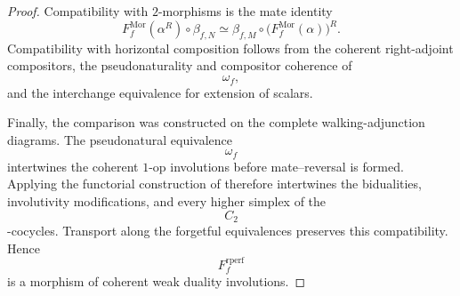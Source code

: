\begin{proof}
Compatibility with $2$-morphisms is the mate identity
\[
    F_f^{\mathrm{Mor}}(\alpha^R)
    \circ
    \beta_{f,N}
    \simeq
    \beta_{f,M}
    \circ
    \bigl(
        F_f^{\mathrm{Mor}}(\alpha)
    \bigr)^R.
\]
Compatibility with horizontal composition follows from the coherent
right-adjoint compositors, the pseudonaturality and compositor coherence
of
\[
    \omega_f,
\]
and the interchange equivalence for extension of scalars.

Finally, the comparison was constructed on the complete
walking-adjunction diagrams. The pseudonatural equivalence
\[
    \omega_f
\]
intertwines the coherent $1$-op involutions before mate--reversal is
formed. Applying the functorial construction of
 therefore intertwines the
bidualities, involutivity modifications, and every higher simplex of the
\[
    C_2
\]
-cocycles. Transport along the forgetful equivalences preserves this
compatibility. Hence
\[
    F_f^{\mathrm{rperf}}
\]
is a morphism of coherent weak duality involutions.
\end{proof}


